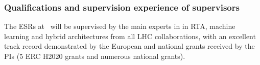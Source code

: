 

%




\subsubsection{Qualifications and supervision experience of supervisors}
\label{subsub:qual_supervisors}


The ESRs at \acronym\ will be supervised by the main experts in in RTA, machine learning and hybrid architectures from all LHC collaborations, with an excellent track record demonstrated by the European and national grants received by the PIs (5 ERC H2020 grants and numerous national grants). 

